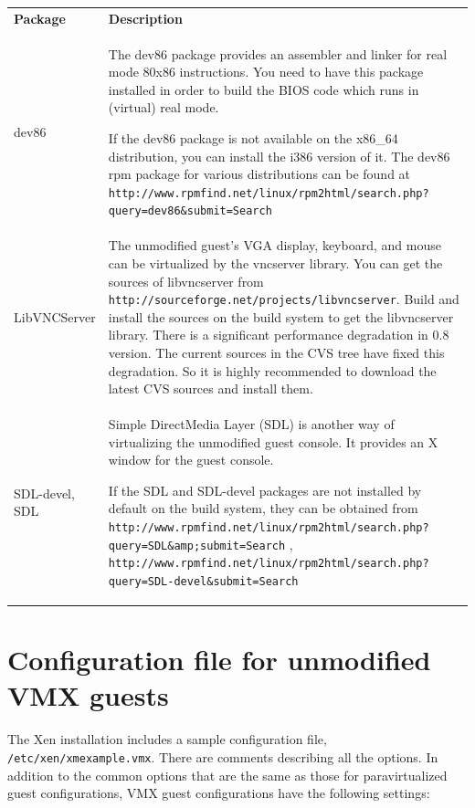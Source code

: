 \documentclass[11pt,twoside,final,openright]{report}
\begin{document}
\begin{tabular}{lp{11.0cm}}
{\bfseries Package} & {\bfseries Description} \\

dev86 & The dev86 package provides an assembler and linker for real mode 80x86 instructions. You need to have this package installed in order to build the BIOS code which runs in (virtual) real mode. 

If the dev86 package is not available on the x86\_64 distribution, you can install the i386 version of it. The dev86 rpm package for various distributions can be found at {\scriptsize {\tt http://www.rpmfind.net/linux/rpm2html/search.php?query=dev86\&submit=Search}} \\

LibVNCServer & The unmodified guest's VGA display, keyboard, and mouse can be virtualized by the vncserver library. You can get the sources of libvncserver from {\small {\tt http://sourceforge.net/projects/libvncserver}}. Build and install the sources on the build system to get the libvncserver library. There is a significant performance degradation in 0.8 version. The current sources in the CVS tree have fixed this degradation. So it is highly recommended to download the latest CVS sources and install them.\\

SDL-devel, SDL & Simple DirectMedia Layer (SDL) is another way of virtualizing the unmodified guest console. It provides an X window for the guest console. 

If the SDL and SDL-devel packages are not installed by default on the build system, they can be obtained from  {\scriptsize {\tt http://www.rpmfind.net/linux/rpm2html/search.php?query=SDL\&amp;submit=Search}}
, {\scriptsize {\tt http://www.rpmfind.net/linux/rpm2html/search.php?query=SDL-devel\&submit=Search}} \\

\end{tabular}

\section{Configuration file for unmodified VMX guests}

The Xen installation includes a sample configuration file, {\small {\tt /etc/xen/xmexample.vmx}}. There are comments describing all the options. In addition to the common options that are the same as those for paravirtualized guest configurations, VMX guest configurations have the following settings:
\end{document}
